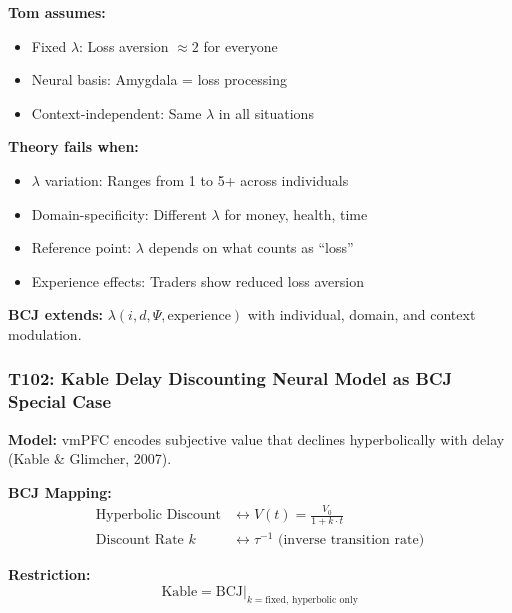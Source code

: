 \begin{tcolorbox}[colback=red!5!white, colframe=red!75!black,
    title=Boundary Condition: Where Tom Fails]
\textbf{Tom assumes:}
\begin{itemize}[nosep]
\item Fixed $\lambda$: Loss aversion $\approx 2$ for everyone
\item Neural basis: Amygdala = loss processing
\item Context-independent: Same $\lambda$ in all situations
\end{itemize}

\textbf{Theory fails when:}
\begin{itemize}[nosep]
\item $\lambda$ variation: Ranges from 1 to 5+ across individuals
\item Domain-specificity: Different $\lambda$ for money, health, time
\item Reference point: $\lambda$ depends on what counts as ``loss''
\item Experience effects: Traders show reduced loss aversion
\end{itemize}

\textbf{BCJ extends:} $\lambda(i, d, \Psi, \text{experience})$ with individual, domain, and context modulation.
\end{tcolorbox}

\subsubsection*{T102: Kable Delay Discounting Neural Model as BCJ Special Case}

\textbf{Model:} vmPFC encodes subjective value that declines hyperbolically with delay (Kable \& Glimcher, 2007).

\textbf{BCJ Mapping:}
\begin{align}
\text{Hyperbolic Discount} &\leftrightarrow V(t) = \frac{V_0}{1 + k \cdot t} \\
\text{Discount Rate } k &\leftrightarrow \tau^{-1} \text{ (inverse transition rate)}
\end{align}

\textbf{Restriction:}
\begin{equation}
\text{Kable} = \text{BCJ} \big|_{k = \text{fixed}, \, \text{hyperbolic only}}
\end{equation}

